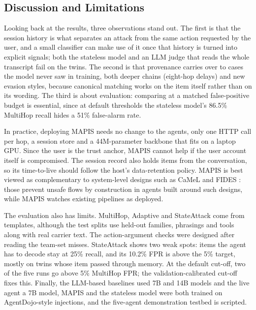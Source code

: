 \documentclass{ieeeaccess}
\begin{document}
\subsection{Discussion and Limitations}
Looking back at the results, three observations stand out. The first is that the session history is what separates an attack from the same action requested by the user, and a small classifier can make use of it once that history is turned into explicit signals; both the stateless model and an LLM judge that reads the whole transcript fail on the twins. The second is that provenance carries over to cases the model never saw in training, both deeper chains (eight-hop delays) and new evasion styles, because canonical matching works on the item itself rather than on its wording. The third is about evaluation: comparing at a matched false-positive budget is essential, since at default thresholds the stateless model's 86.5\% MultiHop recall hides a 51\% false-alarm rate.

In practice, deploying MAPIS needs no change to the agents, only one HTTP call per hop, a session store and a 44M-parameter backbone that fits on a laptop GPU. Since the user is the trust anchor, MAPIS cannot help if the user account itself is compromised. The session record also holds items from the conversation, so its time-to-live should follow the host's data-retention policy. MAPIS is best viewed as complementary to system-level designs such as CaMeL \cite{debenedetti2025camel} and FIDES \cite{costa2025fides}: those prevent unsafe flows by construction in agents built around such designs, while MAPIS watches existing pipelines as deployed.

The evaluation also has limits. MultiHop, Adaptive and StateAttack come from templates, although the test splits use held-out families, phrasings and tools along with real carrier text. The action-argument checks were designed after reading the team-set misses. StateAttack shows two weak spots: items the agent has to decode stay at 25\% recall, and its 10.2\% FPR is above the 5\% target, mostly on twins whose item passed through memory. At the default cut-off, two of the five runs go above 5\% MultiHop FPR; the validation-calibrated cut-off fixes this. Finally, the LLM-based baselines used 7B and 14B models and the live agent a 7B model, MAPIS and the stateless model were both trained on AgentDojo-style injections, and the five-agent demonstration testbed is scripted.

\end{document}
